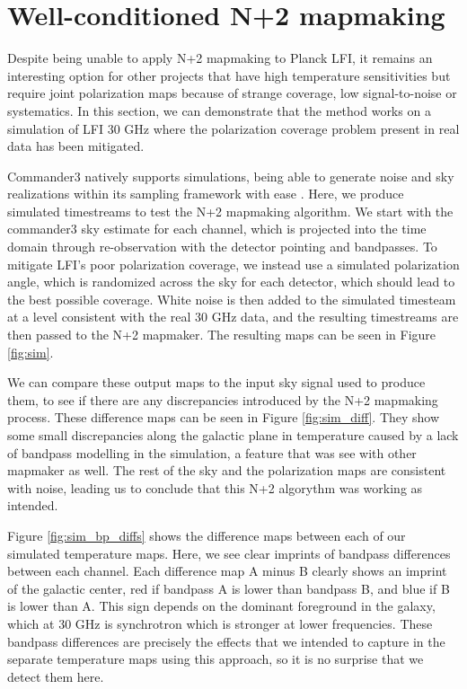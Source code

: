 \documentclass{aa}
\begin{document}
\section{Well-conditioned N+2 mapmaking}
\label{sec:sim}


Despite being unable to apply N+2 mapmaking to Planck LFI, it remains an interesting option for other projects that have high temperature sensitivities but require joint polarization maps because of strange coverage, low signal-to-noise or systematics. In this section, we can demonstrate that the method works on a simulation of LFI 30 GHz where the polarization coverage problem present in real data has been mitigated.

Commander3 natively supports simulations, being able to generate noise and sky realizations within its sampling framework with ease \citep{BP04}. Here, we produce simulated timestreams to test the N+2 mapmaking algorithm. We start with the commander3 sky estimate for each channel, which is projected into the time domain through re-observation with the detector pointing and bandpasses. To mitigate LFI's poor polarization coverage, we instead use a simulated polarization angle, which is randomized across the sky for each detector, which should lead to the best possible coverage. White noise is then added to the simulated timesteam at a level consistent with the real 30 GHz data, and the resulting timestreams are then passed to the N+2 mapmaker. The resulting maps can be seen in Figure \ref{fig:sim}.

We can compare these output maps to the input sky signal used to produce them, to see if there are any discrepancies introduced by the N+2 mapmaking process. These difference maps can be seen in Figure \ref{fig:sim_diff}. They show some small discrepancies along the galactic plane in temperature caused by a lack of bandpass modelling in the simulation, a feature that was see with other mapmaker as well. The rest of the sky and the polarization maps are consistent with noise, leading us to conclude that this N+2 algorythm was working as intended.

Figure \ref{fig:sim_bp_diffs} shows the difference maps between each of our simulated temperature maps. Here, we see clear imprints of bandpass differences between each channel. Each difference map A minus B clearly shows an imprint of the galactic center, red if bandpass A is lower than bandpass B, and blue if B is lower than A. This sign depends on the dominant foreground in the galaxy, which at 30 GHz is synchrotron which is stronger at lower frequencies. These bandpass differences are precisely the effects that we intended to capture in the separate temperature maps using this approach, so it is no surprise that we detect them here.
\end{document}

